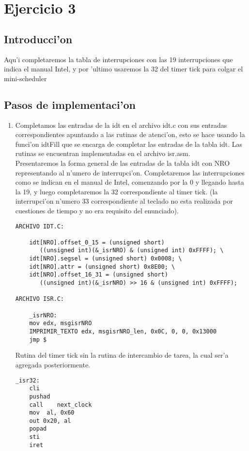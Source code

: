\documentclass[11pt]{article}
\begin{document}
\newpage

\section{Ejercicio 3}
\subsection{Introducci'on}
Aqu'i completaremos la tabla de interrupciones con las 19 interrupciones que indica el manual Intel, y por 'ultimo usaremos la 32 del timer tick para colgar el mini-scheduler
\subsection{Pasos de implementaci'on}
\begin{enumerate}
\item
Completamos las entradas de la idt en el archivo idt.c con sus entradas correspondientes apuntando a las rutinas de atenci'on, esto se hace usando la funci'on idtFill que se encarga de completar las entradas de la tabla idt. Las rutinas se encuentran implementadas en el archivo isr.asm. \\
Presentaremos la forma general de las entradas de la tabla idt con NRO representando al n'umero de interrupci'on. Completaremos las interrupciones como se indican en el manual de Intel, comenzando por la 0 y llegando hasta la 19, y luego completaremos la 32 correspondiente al timer tick. (la interrupci'on n'umero 33 correspondiente al teclado no esta realizada por cuestiones de tiempo y no era requisito del enunciado).\\
\begin{lstlisting}[frame=single]
ARCHIVO IDT.C:

	idt[NRO].offset_0_15 = (unsigned short) 
	   ((unsigned int)(&_isrNRO) & (unsigned int) 0xFFFF); \
	idt[NRO].segsel = (unsigned short) 0x0008; \
	idt[NRO].attr = (unsigned short) 0x8E00; \
	idt[NRO].offset_16_31 = (unsigned short) 
	   ((unsigned int)(&_isrNRO) >> 16 & (unsigned int) 0xFFFF);

ARCHIVO ISR.C:

	_isrNRO:
	mov edx, msgisrNRO
	IMPRIMIR_TEXTO edx, msgisrNRO_len, 0x0C, 0, 0, 0x13000
	jmp $
\end{lstlisting}
Rutina del timer tick sin la rutina de intercambio de tarea, la cual ser'a agregada posteriormente.
\begin{lstlisting}[frame=single]
_isr32:
	cli
	pushad
	call	next_clock
	mov  al, 0x60
	out 0x20, al
	popad
	sti
	iret


\end{lstlisting}
\end{enumerate}
\end{document}
